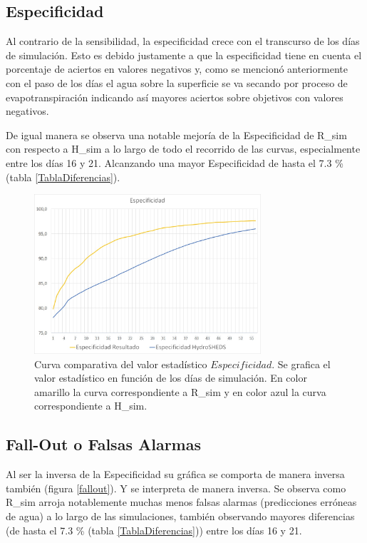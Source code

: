 \documentclass[10pt,a4paper, twoside]{report}
\begin{document}
\subsection{Especificidad}

Al contrario de la sensibilidad, la especificidad crece con el transcurso de los días de simulación. Esto es debido justamente a que la especificidad tiene en cuenta el porcentaje de aciertos en valores negativos y, como se mencionó anteriormente con el paso de los días el agua sobre la superficie se va secando por proceso de evapotranspiración indicando así mayores aciertos sobre objetivos con valores negativos.

De igual manera se observa una notable mejoría de la Especificidad de R\_sim con respecto a H\_sim a lo largo de todo el recorrido de las curvas, especialmente entre los días 16 y 21. Alcanzando una mayor Especificidad de hasta el 7.3 \% (tabla \ref{TablaDiferencias}).

\begin{figure}[H]
   \centering      
   \includegraphics[width=0.75\textwidth]{imagenes/Especificidad.jpg}
 \caption{Curva comparativa del valor estadístico $Especificidad$. Se grafica el valor estadístico en función de los días de simulación. En color amarillo la curva correspondiente a R\_sim y en color azul la curva correspondiente a H\_sim.}
 \label{Especificidad}
\end{figure}


\subsection{Fall-Out o Falsas Alarmas}

Al ser la inversa de la Especificidad su gráfica se comporta de manera inversa también (figura \ref{fallout}). Y se interpreta de manera inversa. Se observa como R\_sim arroja notablemente muchas menos falsas alarmas (predicciones erróneas de agua) a lo largo de las simulaciones, también observando mayores diferencias (de hasta el 7.3 \% (tabla \ref{TablaDiferencias})) entre los días 16 y 21.
\end{document}
